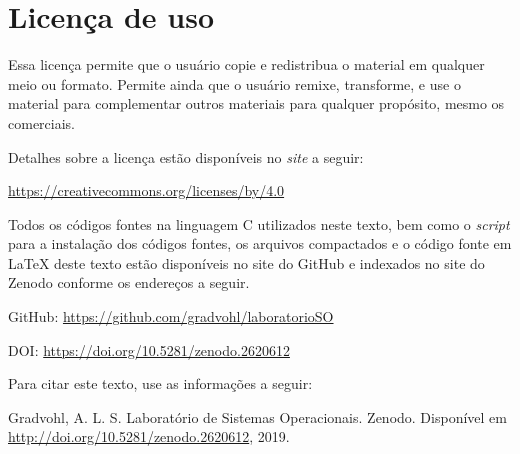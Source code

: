 \chapter*{Licença de uso}\label{chp:licenca}
\doclicenseThis

Essa licença permite que o usuário copie e redistribua o material em qualquer meio ou formato. Permite ainda que o usuário remixe, transforme, e use o material para complementar outros materiais para qualquer propósito, mesmo os comerciais.

 Detalhes sobre a licença estão disponíveis no \textit{site} a seguir:
 \begin{center}
    \url{https://creativecommons.org/licenses/by/4.0}     
 \end{center}

Todos os códigos fontes na linguagem C utilizados neste texto, bem como o \textit{script} para a instalação dos códigos fontes, os arquivos compactados e o código fonte em \LaTeX{} deste texto estão disponíveis no site do GitHub e indexados no site do Zenodo conforme os endereços a seguir.

GitHub: \url{https://github.com/gradvohl/laboratorioSO}

DOI: \url{https://doi.org/10.5281/zenodo.2620612}

Para citar este texto, use as informações a seguir:

\noindent
{\sc Gradvohl, A. L. S.} Laboratório de Sistemas Operacionais. Zenodo. Disponível em \url{http://doi.org/10.5281/zenodo.2620612}, 2019.
